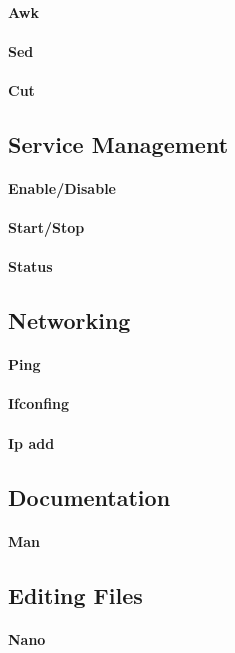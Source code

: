 \paragraph{Awk}
\paragraph{Sed}
\paragraph{Cut}
\subsection{Service Management}
\paragraph{Enable/Disable}
\paragraph{Start/Stop}
\paragraph{Status}
\subsection{Networking}
\paragraph{Ping}
\paragraph{Ifconfing}
\paragraph{Ip add}
\subsection{Documentation}
\paragraph{Man}
\subsection{Editing Files}
\paragraph{Nano}
